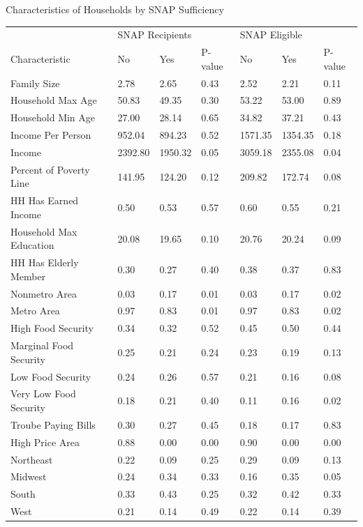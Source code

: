 \documentclass{beamer}
\begin{document}
\begin{frame}
\begin{table}{Characteristics of Households by SNAP Sufficiency}%

\begin{adjustbox}{max width=\textwidth}
  \centering
     \begin{tabular}{lllllll}
    \toprule
    & \multicolumn{3}{l}{SNAP Recipients} & \multicolumn{3}{l}{SNAP Eligible} \\

    Characteristic & No    & Yes   & P-value & No    & Yes   & P-value \\
    \midrule
    Family Size & 2.78  & 2.65  & 0.43  & 2.52  & 2.21  & 0.11 \\
    Household Max Age & 50.83 & 49.35 & 0.30  & 53.22 & 53.00 & 0.89 \\
    Household Min Age & 27.00 & 28.14 & 0.65  & 34.82 & 37.21 & 0.43 \\
    Income Per Person & 952.04 & 894.23 & 0.52  & 1571.35 & 1354.35 & 0.18 \\
    Income & 2392.80 & 1950.32 & 0.05  & 3059.18 & 2355.08 & 0.04 \\
    Percent of Poverty Line & 141.95 & 124.20 & 0.12  & 209.82 & 172.74 & 0.08 \\
    HH Has Earned Income & 0.50  & 0.53  & 0.57  & 0.60  & 0.55  & 0.21 \\
    Household Max Education & 20.08 & 19.65 & 0.10  & 20.76 & 20.24 & 0.09 \\
    HH Has Elderly Member & 0.30  & 0.27  & 0.40  & 0.38  & 0.37  & 0.83 \\
    Nonmetro Area & 0.03  & 0.17  & 0.01  & 0.03  & 0.17  & 0.02 \\
    Metro Area & 0.97  & 0.83  & 0.01  & 0.97  & 0.83  & 0.02 \\
    High Food Security & 0.34  & 0.32  & 0.52  & 0.45  & 0.50  & 0.44 \\
    Marginal Food Security & 0.25  & 0.21  & 0.24  & 0.23  & 0.19  & 0.13 \\
    Low Food Security & 0.24  & 0.26  & 0.57  & 0.21  & 0.16  & 0.08 \\
    Very Low Food Security & 0.18  & 0.21  & 0.40  & 0.11  & 0.16  & 0.02 \\
    Troube Paying Bills & 0.30  & 0.27  & 0.45  & 0.18  & 0.17  & 0.83 \\
    High Price Area & 0.88  & 0.00  & 0.00  & 0.90  & 0.00  & 0.00 \\
    Northeast & 0.22  & 0.09  & 0.25  & 0.29  & 0.09  & 0.13 \\
    Midwest & 0.24  & 0.34  & 0.33  & 0.16  & 0.35  & 0.05 \\
    South & 0.33  & 0.43  & 0.25  & 0.32  & 0.42  & 0.33 \\
    West  & 0.21  & 0.14  & 0.49  & 0.22  & 0.14  & 0.39 \\


\end{tabular}
\end{adjustbox}
\end{table}
\end{frame}
\end{document}

